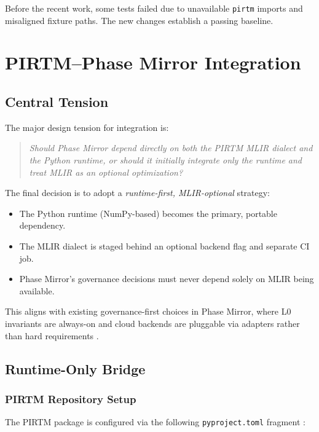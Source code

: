 \documentclass[11pt]{article}
\begin{document}
Before the recent work, some tests failed due to unavailable \texttt{pirtm} imports and misaligned fixture paths. The new changes establish a passing baseline.

\section{PIRTM--Phase Mirror Integration}

\subsection{Central Tension}

The major design tension for integration is:
\begin{quote}
\emph{Should Phase Mirror depend directly on both the PIRTM MLIR dialect and the Python runtime, or should it initially integrate only the runtime and treat MLIR as an optional optimization?}
\end{quote}

The final decision is to adopt a \emph{runtime-first, MLIR-optional} strategy:
\begin{itemize}
  \item The Python runtime (NumPy-based) becomes the primary, portable dependency.
  \item The MLIR dialect is staged behind an optional backend flag and separate CI job.
  \item Phase Mirror's governance decisions must never depend solely on MLIR being available.
\end{itemize}

This aligns with existing governance-first choices in Phase Mirror, where L0 invariants are always-on and cloud backends are pluggable via adapters rather than hard requirements \cite{pm-phases0-3,pm-open-core-dev,pm-gcp-guide}.

\subsection{Runtime-Only Bridge}

\subsubsection{PIRTM Repository Setup}

The PIRTM package is configured via the following \texttt{pyproject.toml} fragment \cite{pirtm-pyproject}:
\end{document}
